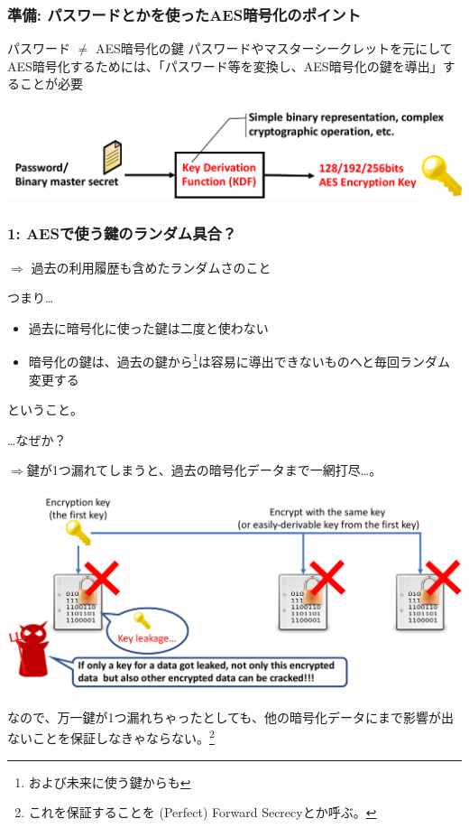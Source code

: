 \documentclass[12pt,dvipdfmx]{beamer}
\begin{document}
\begin{frame}
\frametitle{準備: パスワードとかを使ったAES暗号化のポイント}
\begin{block}{\small パスワード $\neq$ AES暗号化の鍵}
パスワードやマスターシークレットを元にしてAES暗号化するためには、「パスワード等を変換し、AES暗号化の鍵を導出」することが必要
\end{block}
\begin{center}
\includegraphics[width=\linewidth]{Figs/kdf_definition.pdf}
\end{center}
\end{frame}

\begin{frame}
\frametitle{1: AESで使う鍵のランダム具合？}
$\Rightarrow$ \alert{過去の利用履歴も含めたランダムさ}のこと

\vspace{1ex}

\begin{block}{}
つまり…
\begin{itemize}
\item 過去に暗号化に使った鍵は\alert{二度と使わない}
\item 暗号化の鍵は、過去の鍵から\footnote[frame]{および未来に使う鍵からも}は容易に導出できないものへと\alert{毎回ランダム変更}する
\end{itemize}
ということ。
\end{block}

\end{frame}

\begin{frame}
…なぜか？

$\Rightarrow$鍵が1つ漏れてしまうと、過去の暗号化データまで一網打尽…。

\begin{center}
\includegraphics[width=0.9\linewidth]{Figs/pfs_bad_case.pdf}
\end{center}

\begin{block}{}
なので、万一鍵が1つ漏れちゃったとしても、他の暗号化データにまで影響が出ないことを保証しなきゃならない。\footnote[frame]{これを保証することを (Perfect) Forward Secrecyとか呼ぶ。}
\end{block}

\end{frame}
\end{document}
